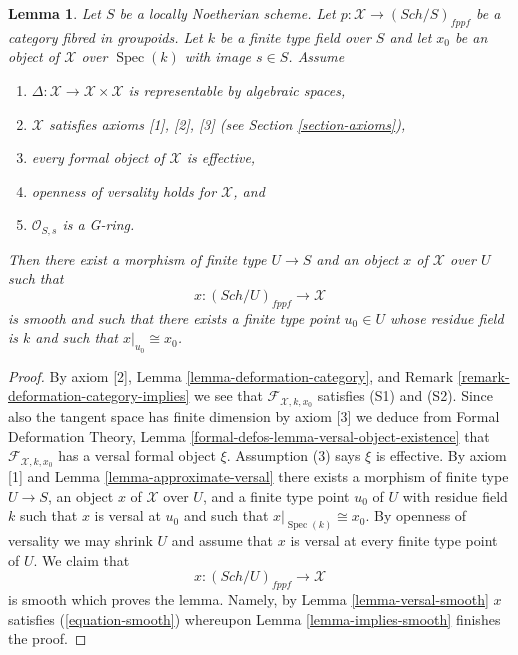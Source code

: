 \documentclass{stacks-project}
\theoremstyle{plain}
\newtheorem{lemma}[subsection]{Lemma}
\theoremstyle{definition}
\theoremstyle{remark}
\numberwithin{equation}{subsection}
\def\Spec{\mathop{\mathrm{Spec}}}
\def\Sch{\mathit{Sch}}
\begin{document}
\begin{lemma}
\label{lemma-get-smooth}
Let $S$ be a locally Noetherian scheme. Let
$p : \mathcal{X} \to (\Sch/S)_{fppf}$ be a category fibred in groupoids.
Let $k$ be a finite type field over $S$ and let $x_0$ be an object of
$\mathcal{X}$ over $\Spec(k)$ with image $s \in S$. Assume
\begin{enumerate}
\item $\Delta : \mathcal{X} \to \mathcal{X} \times \mathcal{X}$ is
representable by algebraic spaces,
\item $\mathcal{X}$ satisfies axioms [1], [2], [3] (see
Section \ref{section-axioms}),
\item every formal object of $\mathcal{X}$ is effective,
\item openness of versality holds for $\mathcal{X}$, and
\item $\mathcal{O}_{S, s}$ is a G-ring.
\end{enumerate}
Then there exist a morphism of finite type $U \to S$ and an object
$x$ of $\mathcal{X}$ over $U$ such that
$$
x : (\Sch/U)_{fppf} \longrightarrow \mathcal{X}
$$
is smooth and such that there exists a finite type point $u_0 \in U$
whose residue field is $k$ and such that $x|_{u_0} \cong x_0$.
\end{lemma}

\begin{proof}
By axiom [2], Lemma \ref{lemma-deformation-category}, and
Remark \ref{remark-deformation-category-implies}
we see that $\mathcal{F}_{\mathcal{X}, k, x_0}$ satisfies (S1) and (S2).
Since also the tangent space has finite dimension by axiom [3]
we deduce from Formal Deformation Theory, Lemma
\ref{formal-defos-lemma-versal-object-existence}
that $\mathcal{F}_{\mathcal{X}, k, x_0}$ has a versal formal object $\xi$.
Assumption (3) says $\xi$ is effective. By axiom [1] and
Lemma \ref{lemma-approximate-versal}
there exists a morphism of finite type $U \to S$, an object $x$ of
$\mathcal{X}$ over $U$, and a finite type point $u_0$ of $U$ with residue
field $k$ such that $x$ is versal at $u_0$ and such that
$x|_{\Spec(k)} \cong x_0$. By openness of versality we may shrink
$U$ and assume that $x$ is versal at every finite type point of $U$.
We claim that
$$
x : (\Sch/U)_{fppf} \longrightarrow \mathcal{X}
$$
is smooth which proves the lemma. Namely, by Lemma \ref{lemma-versal-smooth}
$x$ satisfies (\ref{equation-smooth})
whereupon Lemma \ref{lemma-implies-smooth}
finishes the proof.
\end{proof}
\end{document}
